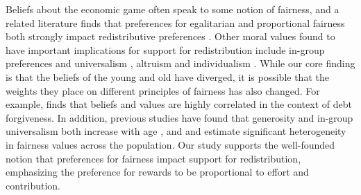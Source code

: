 \documentclass{article}
\begin{document}
Beliefs about the economic game often speak to some notion of fairness, and a related literature finds that preferences for egalitarian and proportional fairness both strongly impact redistributive preferences \citep{fehr1999theory, fong2001social, alesina2005preferences, cappelen2007pluralism, krawczyk2010glimpse, durante2014preferences, stantcheva2021understanding, almaas2020cutthroat, alesina2021perceptions, cavaille2023fair, bonnet2025explains, fehr2026social, almaas2026fairness}.
Other moral values found to have important implications for support for redistribution include in-group preferences and universalism \citep{luttmer2001group,enke2020moral,londono2022impact,enke2023moral,alesina2023immigration,fischbacher2023identity}, altruism \citep{roberts2006patterns} and individualism \citep{landier2022neoliberal}. 
While our core finding is that the beliefs of the young and old have diverged, it is possible that the weights they place on different principles of fairness has also changed. For example, \cite{paine2025attitudes} finds that beliefs and values are highly correlated in the context of debt forgiveness. In addition, previous studies have found that generosity and in-group universalism both increase with age \citep{roberts2006patterns,cutler2021older,cappelen2025universalism}, and \cite{cappelen2007pluralism} and \cite{fehr2026social} estimate significant heterogeneity in fairness values across the population. Our study supports the well-founded notion that preferences for fairness impact support for redistribution, emphasizing the preference for rewards to be proportional to effort and contribution. 
\end{document}
